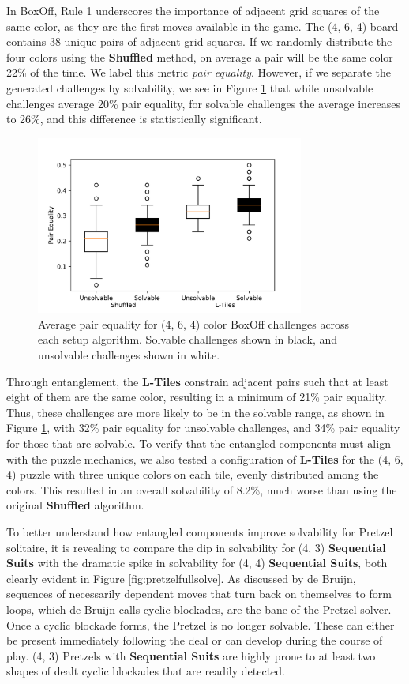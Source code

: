 \documentclass[journal]{IEEEtran}
\begin{document}
In BoxOff, Rule 1 underscores the importance of adjacent grid squares of the same color, as they are the first moves available in the game. The (4, 6, 4) board contains 38 unique pairs of adjacent grid squares. If we randomly distribute the four colors using the \textbf{Shuffled} method, on average a pair will be the same color 22\% of the time. We label this metric {\it pair equality}. However, if we separate the generated challenges by solvability, we see in Figure \ref{fig:boxoffconnected} that while unsolvable challenges average 20\% pair equality, for solvable challenges the average increases to 26\%, and this difference is statistically significant.

\begin{figure}[t]
\includegraphics[width=8.8cm]{figure18.png}
\caption{Average pair equality for (4, 6, 4) color BoxOff challenges across each setup algorithm. Solvable challenges shown in black, and unsolvable challenges shown in white.}
\label{fig:boxoffconnected}
\end{figure}

Through entanglement, the \textbf{L-Tiles} constrain adjacent pairs such that at least eight of them are the same color, resulting in a minimum of 21\% pair equality. Thus, these challenges are more likely to be in the solvable range, as shown in Figure \ref{fig:boxoffconnected}, with 32\% pair equality for unsolvable challenges, and 34\% pair equality for those that are solvable. To verify that the entangled components must align with the puzzle mechanics, we also tested a configuration of \textbf{L-Tiles} for the (4, 6, 4) puzzle with three unique colors on each tile, evenly distributed among the colors. This resulted in an overall solvability of 8.2\%, much worse than using the original \textbf{Shuffled} algorithm.

To better understand how entangled components improve solvability for Pretzel solitaire, it is revealing to compare the dip in solvability for (4, 3) \textbf{Sequential Suits} with the dramatic spike in solvability for (4, 4) \textbf{Sequential Suits}, both clearly evident in Figure \ref{fig:pretzelfullsolve}. As discussed by de Bruijn, sequences of necessarily dependent moves that turn back on themselves to form loops, which de Bruijn calls cyclic blockades, are the bane of the Pretzel solver. Once a cyclic blockade forms, the Pretzel is no longer solvable. These can either be present immediately following the deal or can develop during the course of play. (4, 3) Pretzels with \textbf{Sequential Suits} are highly prone to at least two shapes of dealt cyclic blockades that are readily detected.
\end{document}
